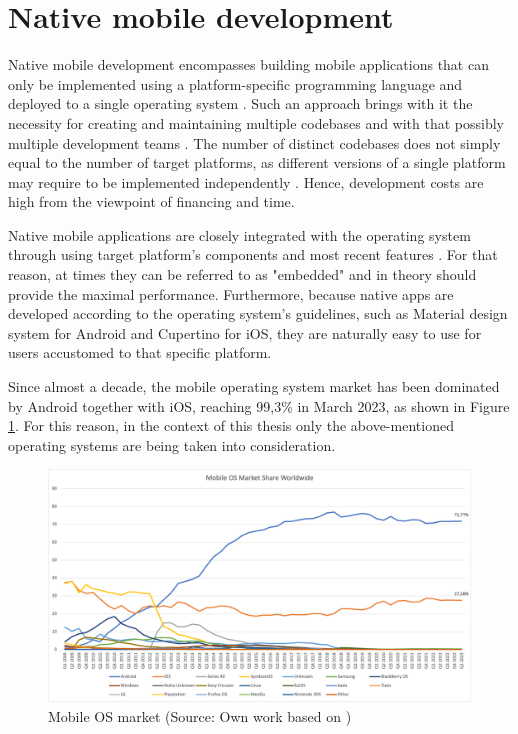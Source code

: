
\section{Native mobile development}\label{chap:native}

Native mobile development encompasses building mobile applications that can only be implemented using a platform-specific programming language and deployed to a single operating system \cite{comparative_analysis_native_hybrid}. Such an approach brings with it the necessity for creating and maintaining multiple codebases and with that possibly multiple development teams \cite{approach_to_assess_performance_case_study}. The number of distinct codebases does not simply equal to the number of target platforms, as different versions of a single platform may require to be implemented independently \cite{appdynamics_mobile_app_performance}. Hence, development costs are high from the viewpoint of financing and time.

Native mobile applications are closely integrated with the operating system through using target platform's components \cite{comparison_perf_looks_flutter_native,comp_analysis_hybrid_frameworks} and most recent features \cite{eval_rn_flutter}. For that reason, at times they can be referred to as "embedded" 
 \cite{cross_platform_development_study_rn_flutter} and in theory should provide the maximal performance. Furthermore, because native apps are developed according to the operating system's guidelines, such as Material design system for Android and Cupertino for iOS, they are naturally easy to use for users accustomed to that specific platform.

Since almost a decade, the mobile operating system market has been dominated by Android together with iOS, reaching 99,3\% in March 2023, as shown in Figure \ref{fig:mobile_os_market}. For this reason, in the context of this thesis only the above-mentioned operating systems are being taken into consideration.

\begin{figure}[H]
  \centering
  \includegraphics[width=\textwidth]{img/mobile_os_market}
  \caption{Mobile OS market (Source: Own work based on \cite{statcounter_mobile_os_market})}
  \label{fig:mobile_os_market}
\end{figure}

